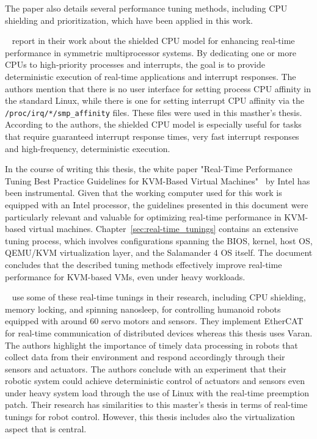 \documentclass[MMR,Master,english]{twbook}
\begin{document}
\noindent The paper also details several performance tuning methods, including CPU shielding and prioritization, which have been applied in this work.

\clearpage

\bigskip \noindent \citeauthor{broskyShieldedProcessorsGuaranteeing2003}~\cite{broskyShieldedProcessorsGuaranteeing2003} report in their work about the shielded CPU model for enhancing real-time performance in symmetric multiprocessor systems. By dedicating one or more CPUs to high-priority processes and interrupts, the goal is to provide deterministic execution of real-time applications and interrupt responses. The authors mention that there is no user interface for setting process CPU affinity in the standard Linux, while there is one for setting interrupt CPU affinity via the \texttt{/proc/irq/*/smp\_affinity} files. These files were used in this masther's thesis. According to the authors, the shielded CPU model is especially useful for tasks that require guaranteed interrupt response times, very fast interrupt responses and high-frequency, deterministic execution.

\bigskip \noindent In the course of writing this thesis, the white paper "Real-Time Performance Tuning Best Practice Guidelines for KVM-Based Virtual Machines"~\cite{RealTimePerformanceTuning2022} by Intel has been instrumental. Given that the working computer used for this work is equipped with an Intel processor, the guidelines presented in this document were particularly relevant and valuable for optimizing real-time performance in KVM-based virtual machines. Chapter~\ref{sec:real-time_tunings} contains an extensive tuning process, which involves configurations spanning the BIOS, kernel, host OS, QEMU/KVM virtualization layer, and the Salamander 4 OS itself. The document concludes that the described tuning methods effectively improve real-time performance for KVM-based VMs, even under heavy workloads.

\bigskip \noindent \citeauthor{yoonRealTimePerformanceAnalysis}~\cite{yoonRealTimePerformanceAnalysis} use some of these real-time tunings in their research, including CPU shielding, memory locking, and spinning nanosleep, for controlling humanoid robots equipped with around 60 servo motors and sensors. They implement EtherCAT for real-time communication of distributed devices whereas this thesis uses Varan. The authors highlight the importance of timely data processing in robots that collect data from their environment and respond accordingly through their sensors and actuators. The authors conclude with an experiment that their robotic system could achieve deterministic control of actuators and sensors even under heavy system load through the use of Linux with the real-time preemption patch. Their research has similarities to this master's thesis in terms of real-time tunings for robot control. However, this thesis includes also the virtualization aspect that is central.
\end{document}
